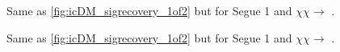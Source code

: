 \begin{figure}[h!]
    \caption{Same as \cref{fig:icDM_sigrecovery_1of2} but for Segue 1 and  $\chi\chi \rightarrow$ .}
    \label{fig:apdx_seg1bb_sigrecovery}
\end{figure}

\begin{figure}[t]
    \caption{Same as \cref{fig:icDM_sigrecovery_1of2} but for Segue 1 and  $\chi\chi \rightarrow$ .}
    \label{fig:apdx_seg1tt_sigrecovery}
\end{figure}

